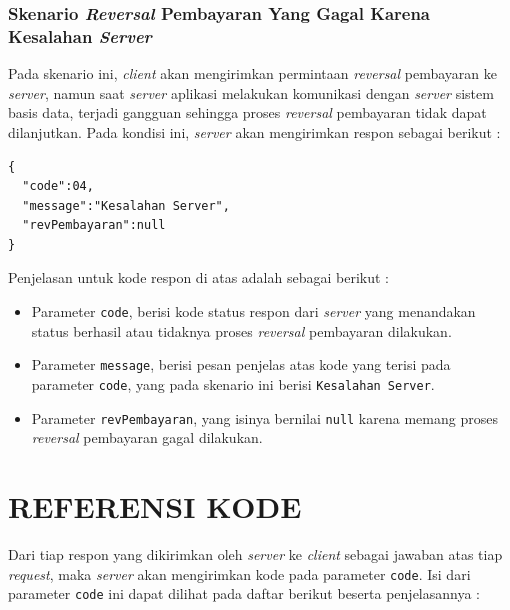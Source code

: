 \documentclass[pdftex,12pt, oneside]{article}
\begin{document}
  \subsubsection{Skenario \textit{Reversal} Pembayaran Yang Gagal Karena Kesalahan \textit{Server}}
  
  Pada skenario ini, \textit{client} akan mengirimkan permintaan \textit{reversal} pembayaran ke \textit{server}, namun saat \textit{server} aplikasi melakukan komunikasi dengan \textit{server} sistem basis data, terjadi gangguan sehingga proses \textit{reversal} pembayaran tidak dapat dilanjutkan. Pada kondisi ini, \textit{server} akan mengirimkan respon sebagai berikut :
  
  \begin{lstlisting}
{
  "code":04,
  "message":"Kesalahan Server",
  "revPembayaran":null
}
  \end{lstlisting}
  
  Penjelasan untuk kode respon di atas adalah sebagai berikut :
  
  \begin{itemize}
    \item Parameter \texttt{code}, berisi kode status respon dari \textit{server} yang menandakan status berhasil atau tidaknya proses \textit{reversal} pembayaran dilakukan.
    \item Parameter \texttt{message}, berisi pesan penjelas atas kode yang terisi pada parameter \texttt{code}, yang pada skenario ini berisi \texttt{Kesalahan Server}.
    \item Parameter \texttt{revPembayaran}, yang isinya bernilai \texttt{null} karena memang proses \textit{reversal} pembayaran gagal dilakukan.
  \end{itemize}

\section{REFERENSI KODE}

Dari tiap respon yang dikirimkan oleh \textit{server} ke \textit{client} sebagai jawaban atas tiap \textit{request}, maka \textit{server} akan mengirimkan kode pada parameter \texttt{code}. Isi dari parameter \texttt{code} ini dapat dilihat pada daftar berikut beserta penjelasannya :
\end{document}
